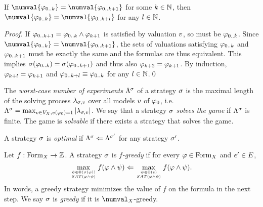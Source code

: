 \begin{lemma}
If $\numval{\aform{k}} = \numval{\aform{k+1}}$ for some $k\in\mathbb{N}$,
then $\numval{\aform{k}} = \numval{\aform{k+l}}$ for any $l\in\mathbb{N}$.
\end{lemma}

\begin{proof}
If $\varphi_{0..k+1} = \varphi_{0..k} \wedge \varphi_{k+1}$
  is satisfied by valuation $v$, so must be $\varphi_{0..k}$.
Since $\numval{\aform{k}} = \numval{\aform{k+1}}$, the sets of
  valuations satisfying $\varphi_{0..k}$ and $\varphi_{0..k+1}$ must be exactly the same
  and the formulas are thus equivalent.
This implies $\sigma(\varphi_{0..k}) = \sigma(\varphi_{0..k+1})$ and thus also
  $\varphi_{k+2} = \varphi_{k+1}$.
By induction, $\varphi_{k+l} = \varphi_{k+1}$ and $\varphi_{0..k+l} \equiv \varphi_{0..k}$
  for any $l\in\mathbb{N}$.\qed
\end{proof}


The \emph{worst-case number of experiments} $\Lambda^{\sigma}$
  of a strategy $\sigma$ is the maximal length of the solving process
  $\lambda_{\sigma,v}$ over all models $v$ of $\varphi_0$, i.e.
  $\Lambda^{\sigma} = \max_{v\in V_X, v(\varphi_0) = 1} |\lambda_{\sigma,v}|$.
We say that a strategy $\sigma$ \emph{solves the game} if $\Lambda^{\sigma}$ is finite.
The game is \emph{solvable} if there exists a strategy that solves the game.


\begin{definition}
A strategy $\sigma$ is \emph{optimal} if
  $\Lambda^{\sigma} <= \Lambda^{\sigma'}$ for any strategy $\sigma'$.
\end{definition}

\begin{definition}
Let $f: \textrm{Form}_X -> \mathbb{Z}$.
A strategy $\sigma$ is \emph{$f$-greedy} if
  for every $\varphi\in\textrm{Form}_X$ and $e'\in E$,
\[
\max_{\psi \in \Phi(\sigma(\varphi)) \atop SAT(\varphi\wedge\psi)} f(\varphi\wedge\psi) <=
\max_{\psi \in \Phi(e) \atop SAT(\varphi\wedge\psi)} f(\varphi\wedge\psi).
\]
In words, a greedy strategy minimizes
  the value of $f$ on the formula in the next step.
We say $\sigma$ is \emph{greedy} if it is $\numval_\Var{}$-greedy.
\end{definition}




